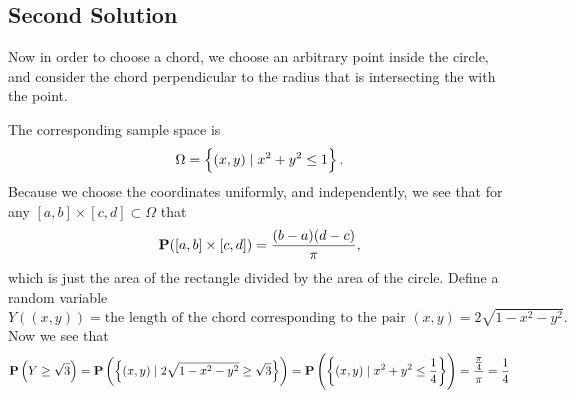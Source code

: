 \documentclass[11pt,a4paper]{article}
\begin{document}
  \subsection{Second Solution}
    Now in order to choose a chord, we choose an arbitrary point inside
    the circle, and consider the chord perpendicular to the radius that is
    intersecting the with the point.
    \begin{center}
    \end{center}
    The corresponding sample space is
    \[
      \Omega = \set{(x, y) \mid x^2 + y^2 \le 1}.
    \]
    Because we choose the coordinates uniformly, and independently, 
    we see that for any
    $[a,b] \times [c,d] \subset \Omega$ that
    \[
      \mathbf{P}([a,b] \times [c,d]) = \frac{(b-a)(d-c)}{\pi},
    \]
    which is just the area of the rectangle divided by the area of the circle.
    Define a random variable
    \[
      Y\left((x, y)\right) = \text{the length of the chord corresponding
      to the pair $(x, y)$} = 2 \sqrt{1 - x^2 - y^2}.
    \]
    Now we see that
    \[
      \mathbf{P}\left(Y \geq \sqrt{3}\right) = 
      \mathbf{P}\left(\set{(x,y) \mid 2 \sqrt{1 - x^2 - y^2} \geq \sqrt{3}}\right) =
      \mathbf{P}\left(\set{(x,y) \mid x^2 + y^2 \le \frac{1}{4}}\right) =
      \frac{\frac{\pi}{4}}{\pi} =
      \frac{1}{4}
    \]
\end{document}
